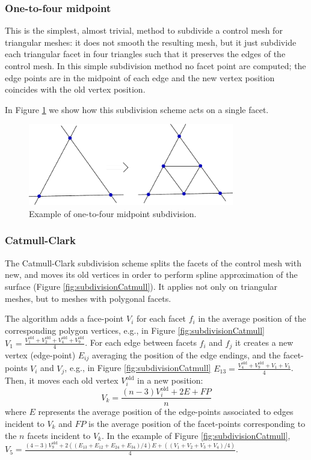 \subsubsection{One-to-four midpoint}

This is the simplest, almost trivial, method to subdivide a control mesh for triangular meshes: it does not smooth the resulting mesh, but it just subdivide each triangular facet in four triangles such that it preserves the edges of the control mesh.
In this simple subdivision method no facet point are computed; the edge points are in the midpoint of each edge and the new vertex position coincides with the old vertex position.


In Figure \ref{fig:subdivisionMid} we show how this subdivision scheme acts on a single facet.



\begin{figure}[tp]
\begin{center}
  \includegraphics[width=0.8\textwidth]{./img/subdivisionMid}
 \caption{Example of one-to-four midpoint subdivision.}
 \label{fig:subdivisionMid}
\end{center}
\end{figure}

\subsubsection{Catmull-Clark}
The Catmull-Clark subdivision scheme splits the facets of the control mesh with new, and moves its old vertices in order to perform spline approximation of the surface (Figure \ref{fig:subdivisionCatmull}). It applies not only on triangular meshes, but to meshes with polygonal facets.

The algorithm adds a face-point $V_i$ for each facet $f_i$ in the average position of the corresponding polygon vertices, e.g., in Figure \ref{fig:subdivisionCatmull} $V_1 = \frac{V_1^{\text{old}} + V_2^{\text{old}} + V_4^{\text{old}} + V_9^{\text{old}}}{4}$. 
For each edge between facets $f_{i}$ and $f_{j}$ it creates a new vertex (edge-point) $E_{ij}$ averaging the position of the edge endings, and the facet-points $V_{i}$ and $V_{j}$, e.g., in Figure \ref{fig:subdivisionCatmull} $E_{13} = \frac{V_4^{\text{old}} + V_9^{\text{old}} + V_1 + V_3}{4}$.
Then, it moves each old vertex $V_i^{\text{old}}$ in a new position:
\[
V_k = \frac{(n-3)V_i^{\text{old}} + 2E + FP}{n}
\]
where $E$ represents the average position of the edge-points associated to edges incident to $V_k$ and  $FP$ is the average position of the facet-points corresponding to the $n$ facets incident to $V_k$. In the example of Figure \ref{fig:subdivisionCatmull}, 
$V_5 = \frac{(4-3)V_9^{\text{old}} + 2((E_{13}+E_{12}+E_{24}+E_{34})/4)E + ((V_1+V_2+V_3+V_4)/4)}{4}$.


